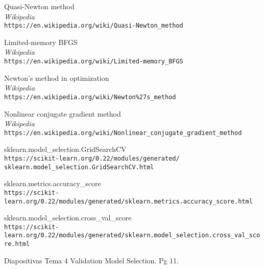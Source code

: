 \begin{thebibliography}{9}
Quasi-Newton method
\\\textit{Wikipedia}
\\\texttt{https://en.wikipedia.org/wiki/Quasi-Newton\_method}

Limited-memory BFGS
\\\textit{Wikipedia}
\\\texttt{https://en.wikipedia.org/wiki/Limited-memory\_BFGS}

Newton's method in optimization
\\\textit{Wikipedia}
\\\texttt{https://en.wikipedia.org/wiki/Newton\%27s\_method}

Nonlinear conjugate gradient method
\\\textit{Wikipedia}
\\\texttt{https://en.wikipedia.org/wiki/Nonlinear\_conjugate\_gradient\_method}

sklearn.model\_selection.GridSearchCV
\\\texttt{https://scikit-learn.org/0.22/modules/generated/\\sklearn.model\_selection.GridSearchCV.html}

sklearn.metrics.accuracy\_score
\\\texttt{https://scikit-learn.org/0.22/modules/generated/sklearn.metrics.accuracy\_score.html}

sklearn.model\_selection.cross\_val\_score
\\\texttt{https://scikit-learn.org/0.22/modules/generated/sklearn.model\_selection.cross\_val\_score.html}

Diapositivas Tema 4 Validation Model Selection. Pg 11.



\end{thebibliography}
